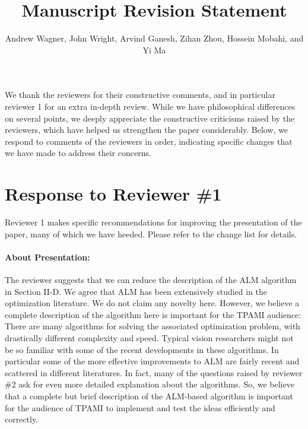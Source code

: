 \documentclass[11pt]{article}
\begin{document}
   

   \title{\Large {\bf Manuscript  Revision Statement}}

       \author{{Andrew Wagner, John Wright, Arvind Ganesh, Zihan Zhou, Hossein Mobahi, and Yi Ma}}

   \date{}
   \maketitle

We thank the reviewers for their constructive comments, and in particular
reviewer 1 for an extra in-depth review.  While we have philosophical
differences on several points, we deeply appreciate the constructive 
criticisms raised by the reviewers, which have helped us strengthen the paper considerably.  
Below, we respond to comments of the reviewers in order, indicating
specific changes that we have made to address their concerns.


\section{Response to Reviewer \#1}
Reviewer 1 makes specific recommendations for improving the
presentation of the paper, many of which we have heeded.  Please refer to the change
list for details. 

\paragraph{About Presentation:} The reviewer suggests that we can reduce the description
of the ALM algorithm in Section II-D. We agree that ALM has been extensively studied in the optimization 
literature. We do not claim any novelty here. However, we believe a complete description of the algorithm 
here is important for the TPAMI audience: There are
many algorithms for solving the associated optimization problem, with drastically different complexity
and speed. Typical vision researchers might not be so familiar with some of the recent
developments in these algorithms. In particular some of the more effective improvements to ALM are fairly 
recent and scattered in different literatures. In fact, many of the questions raised by reviewer \#2
ask for even more detailed explanation about the algorithms. So, we believe that a complete but brief 
description of the ALM-based algorithm is important for the audience of TPAMI to implement and 
test the ideas efficiently and correctly.
\end{document}
